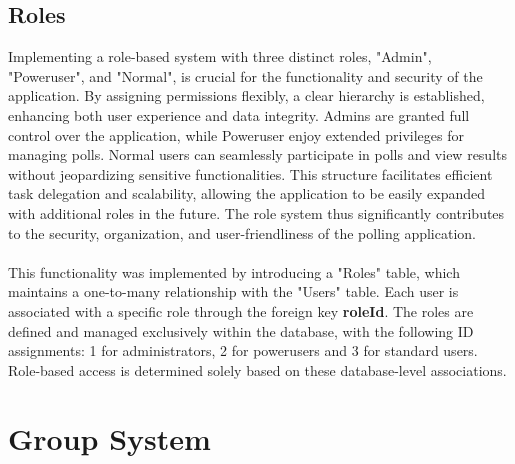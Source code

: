 \documentclass[a4paper,12pt]{report}
\begin{document}
\subsection{Roles}
Implementing a role-based system with three distinct roles, "Admin", "Poweruser", and "Normal", is crucial for the functionality and security of the application. By assigning permissions flexibly, a clear hierarchy is established, enhancing both user experience and data integrity. Admins are granted full control over the application, while Poweruser enjoy extended privileges for managing polls. Normal users can seamlessly participate in polls and view results without jeopardizing sensitive functionalities. This structure facilitates efficient task delegation and scalability, allowing the application to be easily expanded with additional roles  in the future. The role system thus significantly contributes to the security, organization, and user-friendliness of the polling application.\\\\
This functionality was implemented by introducing a "Roles" table, which maintains a one-to-many relationship with the "Users" table. Each user is associated with a specific role through the foreign key \textbf{roleId}. The roles are defined and managed exclusively within the database, with the following ID assignments: 1 for administrators, 2 for powerusers and 3 for standard users. Role-based access is determined solely based on these database-level associations.\\

\section{Group System}
\end{document}
